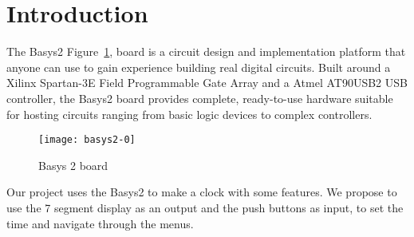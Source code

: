 \section{Introduction}

The Basys2 Figure~\ref{fig:Basys2}, board is a circuit design and implementation platform that anyone can use to gain experience building real digital circuits. Built around a Xilinx Spartan-3E Field Programmable Gate Array and a Atmel AT90USB2 USB controller, the Basys2 board provides complete, ready-to-use hardware suitable for hosting circuits ranging from basic logic devices to complex controllers.


\begin{figure}[!htbp]
    \centerline{\texttt{[image: basys2-0]}}
    \vspace{0cm}\caption{Basys 2 board}
    \label{fig:Basys2}
\end{figure}


Our project uses the Basys2 to make a clock with some features. We propose to use the 7 segment display as an output and the push buttons as input, to set the time and navigate through the menus.

\noindent

